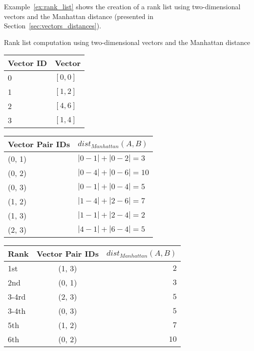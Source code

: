 Example~\ref{ex:rank_list} shows the creation of a rank list using two-dimensional vectors and the Manhattan distance (presented in Section~\ref{sec:vectors_distances}).

\begin{example}[!t]
  \centering
  \caption{Rank list computation using two-dimensional vectors and the Manhattan distance}
  \label{ex:rank_list}

  \begin{subexample}{\linewidth}
    \centering
    \begin{tabular}{l l}
      \toprule
      Vector ID & Vector \\
      \midrule
      0 & $[0, 0]$ \\
      1 & $[1, 2]$ \\
      2 & $[4, 6]$ \\
      3 & $[1, 4]$ \\
      \bottomrule
    \end{tabular}
  \end{subexample}

  \vspace{0.5cm}

  \begin{subexample}{\linewidth}
    \centering
    \begin{tabular}{l l}
      \toprule
      Vector Pair IDs & $dist_{Manhattan}(A, B)$ \\
      \midrule
      (0, 1) & $|0-1| + |0-2| = 3$ \\
      (0, 2) & $|0-4| + |0-6| = 10$ \\
      (0, 3) & $|0-1| + |0-4| = 5$ \\
      (1, 2) & $|1-4| + |2-6| = 7$ \\
      (1, 3) & $|1-1| + |2-4| = 2$ \\
      (2, 3) & $|4-1| + |6-4| = 5$ \\
      \bottomrule
    \end{tabular}
  \end{subexample}

  \vspace{0.5cm}

  \begin{subexample}{\linewidth}
    \centering
    \begin{tabular}{l c r}
      \toprule
      Rank & Vector Pair IDs & $dist_{Manhattan}(A, B)$ \\
      \midrule
      1st   & (1, 3) & $2$ \\
      2nd   & (0, 1) & $3$ \\
      3-4rd & (2, 3) & $5$ \\
      3-4th & (0, 3) & $5$ \\
      5th   & (1, 2) & $7$ \\
      6th   & (0, 2) & $10$ \\
      \bottomrule
    \end{tabular}
  \end{subexample}
\end{example}

